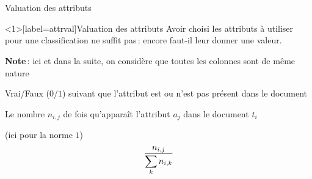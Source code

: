 \documentclass[../allslides.tex]{subfiles}
\begin{document}
\section{}{Valuation des attributs}
\begin{frame}<1>[label=attrval]{Valuation des attributs}
	Avoir choisi les attributs à utiliser pour une classification ne suffit pas : encore faut-il leur donner une \alert{valeur}.

	\textbf{Note} : ici et dans la suite, on considère que toutes les colonnes sont de même nature

	\begin{description}[*]
		\item<2->[Booléenne] Vrai/Faux (\(0\)/\(1\)) suivant que l'attribut est ou n'est pas présent dans le document
		\item<3->[Occurrences] Le nombre \(n_{i,j}\) de fois qu'apparaît l'attribut \(a_j\) dans le document \(t_i\)
		\item<4->[Fréquences normalisées par ligne] (ici pour la norme \(1\))
			\begin{equation}
				\frac{\mathnode{freqfracnum}{n_{i,j}}}{\mathnode{freqfracden}{\sum_k n_{i,k}}}
			\end{equation}
	\end{description}
\end{frame}
\end{document}
